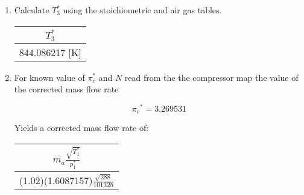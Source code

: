 \documentclass[12pt,english]{article}
\begin{document}
\begin{enumerate}
  \item Calculate $T_{3}^{*}$ using the stoichiometric and air gas tables. 
  
  \begin{center}
    \begin{tabular}{|c|}
      \hline
      $T_{3}^{*}$ \\
      \hline
      844.086217 [K] \\
      \hline
    \end{tabular}
  \end{center}

  \item For known value of $\pi_{c}^{*}$ and $N$ read from the the compressor map the value of the corrected mass flow rate

  \begin{equation}
    \pi{_c}^{*} = 3.269531
  \end{equation}

  Yields a corrected mass flow rate of:

  \begin{center}
    \begin{tabular}{|c|}
      \hline
      $m_{a}\frac{\sqrt{T_{1}^{*}}}{p_{1}^{*}}$ \\
      \hline
      (1.02)(1.6087157)$\frac{\sqrt{288}}{101325}$ \\
      \hline
    \end{tabular}
  \end{center}


\end{enumerate}
\end{document}
